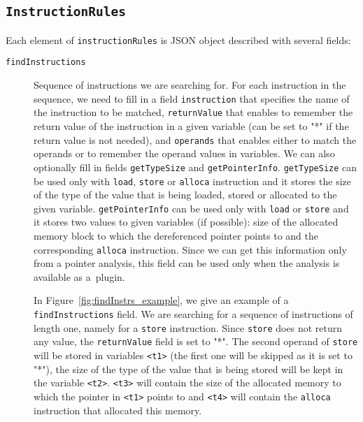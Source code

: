 \subsection{\texttt{InstructionRules}}
Each element of \texttt{instructionRules} is JSON object described with
several fields:
\begin{description}
    \item[\texttt{findInstructions}] Sequence of instructions we are searching
    for. For each instruction in the sequence, we need to fill in a field
        \texttt{instruction} that specifies the name of the instruction to be
        matched, \texttt{returnValue} that enables to remember the return value
        of the instruction in a given variable (can be set to "*" if the return
        value is not needed), and \texttt{operands} that enables either to
        match the operands or to remember the operand values in variables. We
        can also optionally fill in fields \texttt{getTypeSize} and
        \texttt{getPointerInfo}. \texttt{getTypeSize} can be used only with
        \texttt{load}, \texttt{store} or \texttt{alloca} instruction and it
        stores the size of the type of the value that is being loaded, stored
        or allocated to the given variable. \texttt{getPointerInfo} can be used
        only with \texttt{load} or \texttt{store} and it stores two values to
        given variables (if possible): size of the allocated memory block to which
        the dereferenced pointer points to and the corresponding \texttt{alloca}
        instruction. Since we can get this information only from a pointer
        analysis, this field can be used only when the analysis is available as
        a~plugin.

        In Figure~\ref{fig:findInstrs_example}, we give an example of a
        \texttt{findInstructions} field. We are searching for a sequence of
        instructions of length one, namely for a \texttt{store} instruction.
        Since \texttt{store} does not return any value, the
        \texttt{returnValue} field is set to "*". The second operand of
        \texttt{store} will be stored in variables \texttt{<t1>} (the first one
        will be skipped as it is set to "*"), the size of the type
        of the value that is being stored will be kept in the variable
        \texttt{<t2>}. \texttt{<t3>} will contain the size of the allocated
        memory to which the pointer in \texttt{<t1>} points to and
        \texttt{<t4>} will contain the \texttt{alloca} instruction that
        allocated this memory.


\end{description}
